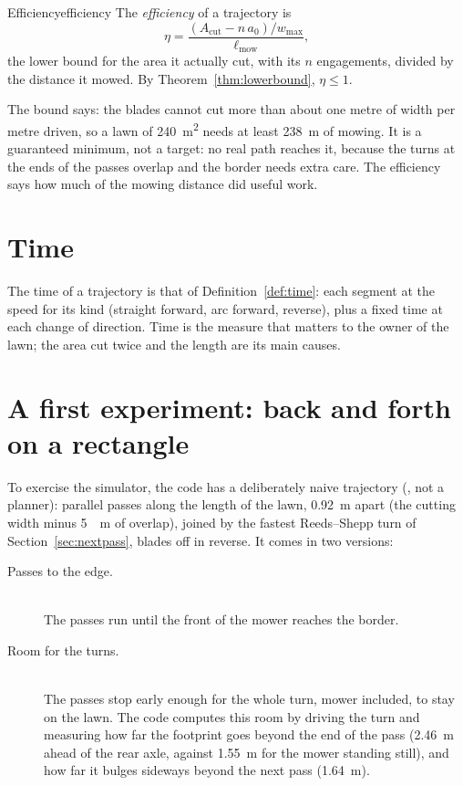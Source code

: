 \begin{definition}{Efficiency}{efficiency}
  The \emph{efficiency} of a trajectory is
  \[
    \eta = \frac{(A_{\mathrm{cut}} - n\,a_0)/w_{\max}}{\ell_{\mathrm{mow}}},
  \]
  the lower bound for the area it actually cut, with its $n$ engagements,
  divided by the distance it mowed. By Theorem~\ref{thm:lowerbound},
  $\eta \le 1$.
\end{definition}

\begin{inwords}
  The bound says: the blades cannot cut more than about one metre of width
  per metre driven, so a lawn of \SI{240}{\metre\squared} needs at least
  \SI{238}{\metre} of mowing. It is a guaranteed minimum, not a target: no
  real path reaches it, because the turns at the ends of the passes overlap
  and the border needs extra care. The efficiency says how much of the
  mowing distance did useful work.
\end{inwords}

\section{Time}

The time of a trajectory is that of Definition~\ref{def:time}: each segment
at the speed for its kind (straight forward, arc forward, reverse), plus a
fixed time at each change of direction. Time is the measure that matters to
the owner of the lawn; the area cut twice and the length are its main
causes.

\section{A first experiment: back and forth on a rectangle}

To exercise the simulator, the code has a deliberately naive trajectory
(, not a planner): parallel passes along the length of
the lawn, \SI{0.92}{\metre} apart (the cutting width minus \SI{5}{\centi
\metre} of overlap), joined by the fastest Reeds--Shepp turn of
Section~\ref{sec:nextpass}, blades off in reverse. It comes in two
versions:

\begin{description}
  \item[Passes to the edge.]
    \leavevmode\\
    The passes run until the front of the mower reaches the border.
  \item[Room for the turns.]
    \leavevmode\\
    The passes stop early enough for the whole turn, mower included, to stay
    on the lawn. The code computes this room by driving the turn and
    measuring how far the footprint goes beyond the end of the pass
    (\SI{2.46}{\metre} ahead of the rear axle, against \SI{1.55}{\metre} for
    the mower standing still), and how far it bulges sideways beyond the next
    pass (\SI{1.64}{\metre}).
\end{description}

